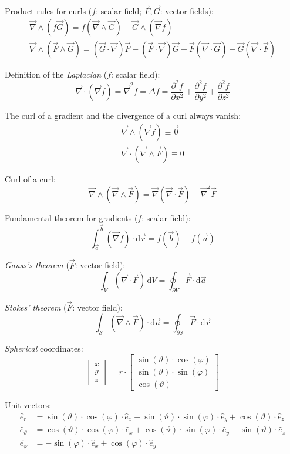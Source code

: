 \documentclass[fontsize=11pt,a4paper]{scrartcl}
\begin{document}
Product rules for curls ($f$: scalar field; $\vec F,\vec G$: vector fields):
\begin{gather*}
	\vec\nabla\wedge(f\vec G) = f(\vec\nabla\wedge\vec G) - \vec G\wedge(\vec\nabla f)\\
	\vec\nabla\wedge(\vec F\wedge\vec G) = (\vec G\cdot\vec\nabla)\vec F - (\vec F\cdot\vec\nabla)\vec G+\vec F(\vec\nabla\cdot\vec G) - \vec G(\vec\nabla\cdot\vec F)
\end{gather*}

Definition of the \emph{Laplacian} ($f$: scalar field):
\[
	\vec\nabla\cdot(\vec\nabla f) = \vec\nabla^2 f = \Delta f = \frac{\partial^2 f}{\partial x^2} + \frac{\partial^2 f}{\partial y^2} + \frac{\partial^2 f}{\partial z^2}
\]

The curl of a gradient and the divergence of a curl always vanish:
\begin{gather*}
	\vec\nabla\wedge(\vec\nabla f)\equiv\vec 0\\
	\vec\nabla\cdot(\vec\nabla\wedge\vec F)\equiv 0
\end{gather*}

Curl of a curl:
\[
	\vec\nabla\wedge(\vec\nabla\wedge\vec F) = \vec\nabla(\vec\nabla\cdot\vec F) - \vec\nabla^2\vec F
\]

Fundamental theorem for gradients ($f$: scalar field):
\[
	\int_{\vec a}^{\vec b} (\vec\nabla f)\cdot\mathrm{d}\vec r = f(\vec b) - f(\vec a)
\]

\emph{Gauss's theorem} ($\vec F$: vector field):
\[
	\int_V(\vec\nabla\cdot\vec F)\,\mathrm{d}V = \oint_{\partial V}\vec F\cdot\mathrm{d}\vec a
\]

\emph{Stokes' theorem} ($\vec F$: vector field):
\[
	\int_\mathcal{S}(\vec\nabla\wedge\vec F)\cdot\mathrm{d}\vec a = \oint_{\partial\mathcal{S}}\vec F\cdot\mathrm{d}\vec r
\]

\emph{Spherical} coordinates:
\[
	\begin{bmatrix}x\\ y\\ z\end{bmatrix} =
	r\cdot\begin{bmatrix}\sin(\vartheta)\cdot\cos(\varphi)\\ \sin(\vartheta)\cdot\sin(\varphi)\\ \cos(\vartheta)\end{bmatrix}
\]

Unit vectors:
\begin{align*}
	\hat e_r &= \sin(\vartheta)\cdot\cos(\varphi)\cdot\hat e_x + \sin(\vartheta)\cdot\sin(\varphi)\cdot\hat e_y + \cos(\vartheta)\cdot\hat e_z\\
	\hat e_\vartheta &= \cos(\vartheta)\cdot\cos(\varphi)\cdot\hat e_x + \cos(\vartheta)\cdot\sin(\varphi)\cdot\hat e_y - \sin(\vartheta)\cdot\hat e_z\\
	\hat e_\varphi &= -\sin(\varphi)\cdot\hat e_x + \cos(\varphi)\cdot\hat e_y
\end{align*}
\end{document}

